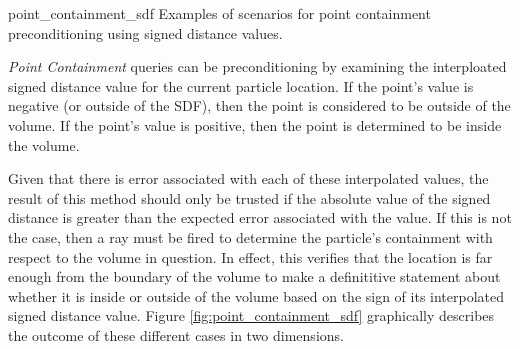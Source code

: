               {point_containment_sdf}
              {Examples of scenarios for point containment preconditioning using signed distance values.}
              {
                \textit{Point Containment} queries can be preconditioning by examining
                the interploated signed distance value for the current particle
                location. If the point's value is negative (or outside of the
                SDF), then the point is considered to be outside of the
                volume. If the point's value is positive, then the point is
                determined to be inside the volume.

                Given that there is error associated with each of these
                interpolated values, the result of this method should only be
                trusted if the absolute value of the signed distance is greater
                than the expected error associated with the value. If
                this is not the case, then a ray must be fired to determine the
                particle's containment with respect to the volume in
                question. In effect, this verifies that the location is far
                enough from the boundary of the volume to make a definititive
                statement about whether it is inside or outside of the volume
                based on the sign of its interpolated signed distance value.
                Figure \ref{fig:point_containment_sdf} graphically describes the
                outcome of these different cases in two dimensions.
              }

